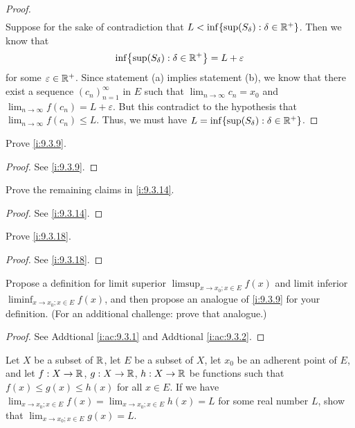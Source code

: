 \begin{proof}
\begin{align*}
  \end{align*}
  Suppose for the sake of contradiction that \(L < \inf\set{\sup(S_\delta) : \delta \in \R^+}\).
  Then we know that
  \[
    \inf\set{\sup(S_\delta) : \delta \in \R^+} = L + \varepsilon
  \]
  for some \(\varepsilon \in \mathbb{R}^+\).
  Since statement (a) implies statement (b), we know that there exist a sequence \((c_n)_{n = 1}^\infty\) in \(E\) such that \(\lim_{n \to \infty} c_n = x_0\) and \(\lim_{n \to \infty} f(c_n) = L + \varepsilon\).
  But this contradict to the hypothesis that \(\lim_{n \to \infty} f(c_n) \leq L\).
  Thus, we must have \(L = \inf\set{\sup(S_{\delta}) : \delta \in \R^+}\).
\end{proof}

\exercisesection

\begin{ex}\label{i:ex:9.3.1}
  Prove \cref{i:9.3.9}.
\end{ex}

\begin{proof}
  See \cref{i:9.3.9}.
\end{proof}

\begin{ex}\label{i:ex:9.3.2}
  Prove the remaining claims in \cref{i:9.3.14}.
\end{ex}

\begin{proof}
  See \cref{i:9.3.14}.
\end{proof}

\begin{ex}\label{i:ex:9.3.3}
  Prove \cref{i:9.3.18}.
\end{ex}

\begin{proof}
  See \cref{i:9.3.18}.
\end{proof}

\begin{ex}\label{i:ex:9.3.4}
  Propose a definition for limit superior \(\limsup_{x \to x_0 ; x \in E} f(x)\) and limit inferior \(\liminf_{x \to x_0 ; x \in E} f(x)\), and then propose an analogue of \cref{i:9.3.9} for your definition.
  (For an additional challenge: prove that analogue.)
\end{ex}

\begin{proof}
  See Addtional \cref{i:ac:9.3.1} and Addtional \cref{i:ac:9.3.2}.
\end{proof}

\begin{ex}\label{i:ex:9.3.5}
  Let \(X\) be a subset of \(\mathbb{R}\), let \(E\) be a subset of \(X\), let \(x_0\) be an adherent point of \(E\), and let \(f : X \to \mathbb{R}\), \(g : X \to \mathbb{R}\), \(h : X \to \mathbb{R}\) be functions such that \(f(x) \leq g(x) \leq h(x)\) for all \(x \in E\).
  If we have \(\lim_{x \to x_0 ; x \in E} f(x) = \lim_{x \to x_0 ; x \in E} h(x) = L\) for some real number \(L\), show that \(\lim_{x \to x_0 ; x \in E} g(x) = L\).
\end{ex}


